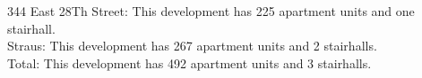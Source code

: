 {344 East 28Th Street}: This development has 225 apartment units and one stairhall.\\{Straus}: This development has 267 apartment units and 2 stairhalls.\\{Total}: This development has 492 apartment units and 3 stairhalls.\\